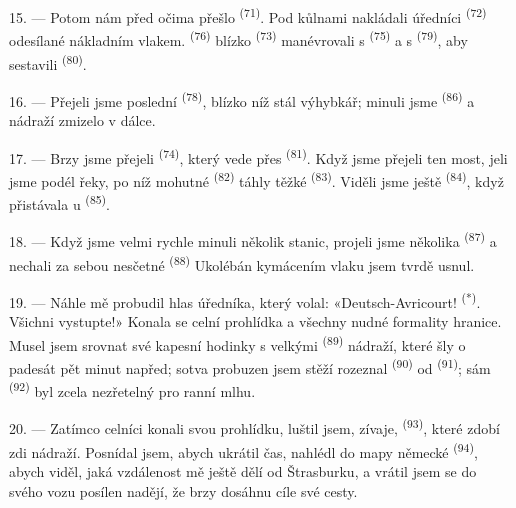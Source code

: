 15. --- Potom nám před očima přešlo  \textsuperscript{(71)}. Pod
kůlnami nakládali úředníci  \textsuperscript{(72)} odesílané nákladním vlakem.
 \textsuperscript{(76)} blízko  \textsuperscript{(73)}
manévrovali s
 \textsuperscript{(75)} a s 
\textsuperscript{(79)}, aby sestavili  \textsuperscript{(80)}.

16. --- Přejeli jsme poslední  \textsuperscript{(78)}, blízko níž stál
výhybkář; minuli jsme  \textsuperscript{(86)} a nádraží zmizelo v dálce.

17. --- Brzy jsme přejeli  \textsuperscript{(74)}, který vede přes
 \textsuperscript{(81)}. Když jsme přejeli ten most, jeli jsme podél
řeky, po níž mohutné  \textsuperscript{(82)} táhly těžké
 \textsuperscript{(83)}. Viděli jsme ještě 
\textsuperscript{(84)}, když přistávala u  \textsuperscript{(85)}.

18. --- Když jsme velmi rychle minuli několik stanic, projeli jsme několika
 \textsuperscript{(87)} a nechali za sebou nesčetné 
\textsuperscript{(88)}  Ukolébán kymácením vlaku jsem tvrdě usnul.

\VUsaut{3.0mm}
\VUsaut{3.0mm}

19. --- Náhle mě probudil hlas úředníka, který volal: «Deutsch-Avricourt!
\textsuperscript{(*)}. Všichni vystupte!» Konala se celní prohlídka a všechny nudné formality
hranice. Musel jsem srovnat své kapesní hodinky s velkými
 \textsuperscript{(89)} nádraží, které šly o padesát pět minut
napřed; sotva probuzen jsem stěží rozeznal  \textsuperscript{(90)} od
 \textsuperscript{(91)}; sám
 \textsuperscript{(92)} byl zcela nezřetelný pro ranní mlhu.

20. --- Zatímco celníci konali svou prohlídku, luštil jsem, zívaje, 
\textsuperscript{(93)}, které zdobí zdi nádraží. Posnídal jsem, abych ukrátil čas, nahlédl do
mapy německé  \textsuperscript{(94)}, abych viděl, jaká vzdálenost mě ještě dělí
od Štrasburku, a vrátil jsem se do svého vozu posílen nadějí, že brzy dosáhnu cíle své cesty.
